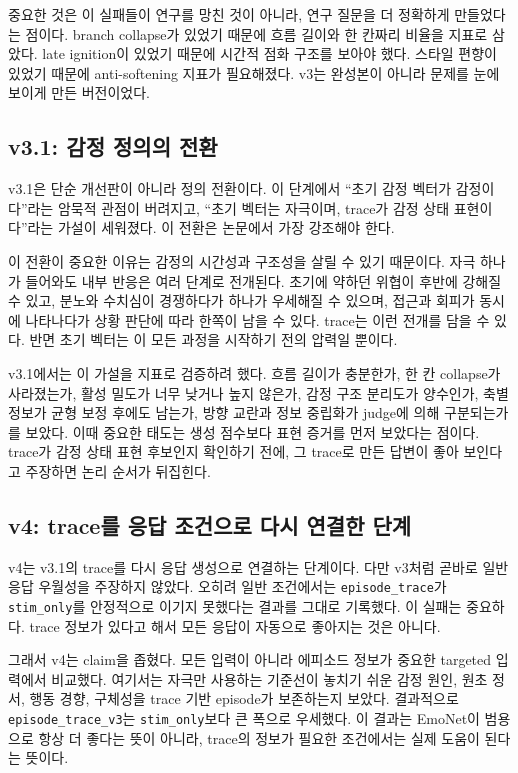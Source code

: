 \documentclass[11pt,a4paper]{article}
\newcommand{\eng}[1]{\texttt{#1}}
\begin{document}
중요한 것은 이 실패들이 연구를 망친 것이 아니라, 연구 질문을 더 정확하게 만들었다는 점이다. branch collapse가 있었기 때문에 흐름 길이와 한 칸짜리 비율을 지표로 삼았다. late ignition이 있었기 때문에 시간적 점화 구조를 보아야 했다. 스타일 편향이 있었기 때문에 anti-softening 지표가 필요해졌다. v3는 완성본이 아니라 문제를 눈에 보이게 만든 버전이었다.

\subsection{v3.1: 감정 정의의 전환}

v3.1은 단순 개선판이 아니라 정의 전환이다. 이 단계에서 ``초기 감정 벡터가 감정이다''라는 암묵적 관점이 버려지고, ``초기 벡터는 자극이며, trace가 감정 상태 표현이다''라는 가설이 세워졌다. 이 전환은 논문에서 가장 강조해야 한다.

이 전환이 중요한 이유는 감정의 시간성과 구조성을 살릴 수 있기 때문이다. 자극 하나가 들어와도 내부 반응은 여러 단계로 전개된다. 초기에 약하던 위협이 후반에 강해질 수 있고, 분노와 수치심이 경쟁하다가 하나가 우세해질 수 있으며, 접근과 회피가 동시에 나타나다가 상황 판단에 따라 한쪽이 남을 수 있다. trace는 이런 전개를 담을 수 있다. 반면 초기 벡터는 이 모든 과정을 시작하기 전의 압력일 뿐이다.

v3.1에서는 이 가설을 지표로 검증하려 했다. 흐름 길이가 충분한가, 한 칸 collapse가 사라졌는가, 활성 밀도가 너무 낮거나 높지 않은가, 감정 구조 분리도가 양수인가, 축별 정보가 균형 보정 후에도 남는가, 방향 교란과 정보 중립화가 judge에 의해 구분되는가를 보았다. 이때 중요한 태도는 생성 점수보다 표현 증거를 먼저 보았다는 점이다. trace가 감정 상태 표현 후보인지 확인하기 전에, 그 trace로 만든 답변이 좋아 보인다고 주장하면 논리 순서가 뒤집힌다.

\subsection{v4: trace를 응답 조건으로 다시 연결한 단계}

v4는 v3.1의 trace를 다시 응답 생성으로 연결하는 단계이다. 다만 v3처럼 곧바로 일반 응답 우월성을 주장하지 않았다. 오히려 일반 조건에서는 \eng{episode\_trace}가 \eng{stim\_only}를 안정적으로 이기지 못했다는 결과를 그대로 기록했다. 이 실패는 중요하다. trace 정보가 있다고 해서 모든 응답이 자동으로 좋아지는 것은 아니다.

그래서 v4는 claim을 좁혔다. 모든 입력이 아니라 에피소드 정보가 중요한 targeted 입력에서 비교했다. 여기서는 자극만 사용하는 기준선이 놓치기 쉬운 감정 원인, 원초 정서, 행동 경향, 구체성을 trace 기반 episode가 보존하는지 보았다. 결과적으로 \eng{episode\_trace\_v3}는 \eng{stim\_only}보다 큰 폭으로 우세했다. 이 결과는 EmoNet이 범용으로 항상 더 좋다는 뜻이 아니라, trace의 정보가 필요한 조건에서는 실제 도움이 된다는 뜻이다.
\end{document}
